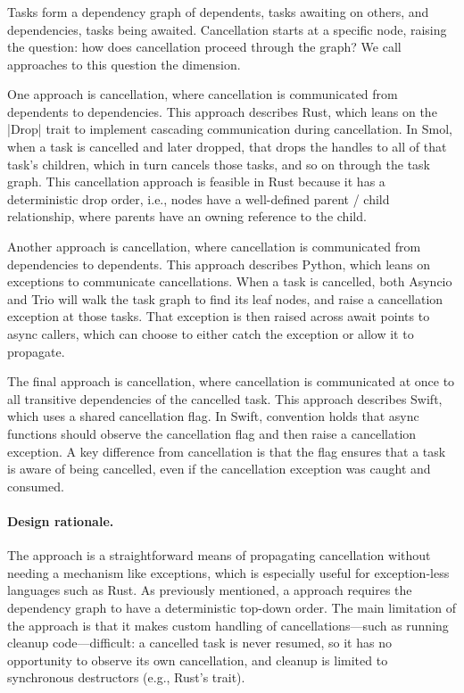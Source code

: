 \subsubsection{\Direction}
\label{ssec:designdims:direction}

Tasks form a dependency graph of dependents, tasks awaiting on others, and dependencies, tasks being awaited. Cancellation starts at a specific node, raising the question: how does cancellation proceed through the graph? We call approaches to this question the \direction dimension.

One approach is \tdown cancellation, where cancellation is communicated from dependents to dependencies. This approach describes Rust, which leans on the \code|Drop| trait to implement cascading communication during cancellation. In Smol, when a task is cancelled and later dropped, that drops the handles to all of that task's children, which in turn cancels those tasks, and so on through the task graph. This cancellation approach is feasible in Rust because it has a deterministic drop order, i.e., nodes have a well-defined parent / child relationship, where parents have an owning reference to the child.

Another approach is \bup cancellation, where cancellation is communicated from dependencies to dependents. This approach describes Python, which leans on exceptions to communicate cancellations. When a task is cancelled, both Asyncio and Trio will walk the task graph to find its leaf nodes, and raise a cancellation exception at those tasks. That exception is then raised across await points to async callers, which can choose to either catch the exception or allow it to propagate.

The final approach is \simultaneous cancellation, where cancellation is communicated at once to all transitive dependencies of the cancelled task. This approach describes Swift, which uses a shared cancellation flag. In Swift, convention holds that async functions should observe the cancellation flag and then raise a cancellation exception. A key difference from \bup cancellation is that the flag ensures that a task is aware of being cancelled, even if the cancellation exception was caught and consumed.

\paragraph{Design rationale.} The \tdown approach is a straightforward means of propagating cancellation without needing a mechanism like exceptions, which is especially useful for exception-less languages such as Rust. As previously mentioned, a \tdown approach requires the dependency graph to have a deterministic top-down order. The main limitation of the \tdown approach is that it makes custom handling of cancellations---such as running cleanup code---difficult: a cancelled task is never resumed, so it has no opportunity to observe its own cancellation, and cleanup is limited to synchronous destructors (e.g., Rust's  trait).

